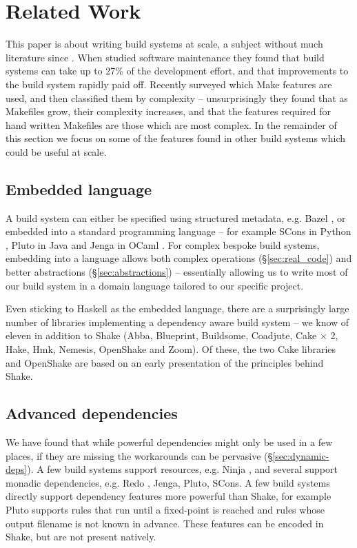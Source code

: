 \section{Related Work\label{section-review}}

This paper is about writing build systems at scale, a subject without much
literature since \citet{miller:recursive_make}. When
\citet{mcintosh:build_maintenance_effort} studied software maintenance they
found that build systems can take up to 27\% of the
development effort, and that improvements to the build system rapidly paid off.
Recently \citet{martin:make_it_simple} surveyed which Make features are used,
and then \citet{martin:maintenance_complexity_makefiles} classified them by
complexity -- unsurprisingly they found that as Makefiles grow, their complexity
increases, and that the features required for hand written Makefiles are those
which are most complex. In the remainder of this section we focus on some of the
features found in other build systems which could be useful at scale.

\subsection{Embedded language}

A build system can either be specified using structured metadata, e.g. Bazel
\cite{bazel}, or embedded into a standard programming language -- for example
SCons in Python \cite{scons}, Pluto in Java \cite{pluto} and Jenga in OCaml
\cite{jenga}. For complex bespoke build systems, embedding into a language
allows both complex operations (\S\ref{sec:real_code}) and better abstractions
(\S\ref{sec:abstractions}) -- essentially allowing us to write most of our build
system in a domain language tailored to our specific project.

Even sticking to Haskell as the embedded language, there are a surprisingly
large number of libraries implementing a dependency aware build system -- we
know of eleven in addition to Shake (Abba, Blueprint, Buildsome, Coadjute, Cake
$\times$ 2, Hake, Hmk, Nemesis, OpenShake and Zoom). Of these, the two Cake
libraries and OpenShake are based on an early presentation of the principles behind Shake.

\subsection{Advanced dependencies}

We have found that while powerful dependencies might only be used in a few
places, if they are missing the workarounds can be pervasive
(\S\ref{sec:dynamic-deps}). A few build systems support resources, e.g.
Ninja \cite{ninja}, and several support monadic dependencies, e.g. Redo
\cite{redo}, Jenga, Pluto, SCons. A few build systems directly support
dependency features more powerful than Shake, for example Pluto supports rules
that run until a fixed-point is reached and rules whose output filename is not known in
advance. These features can be encoded in Shake, but are not present natively.

